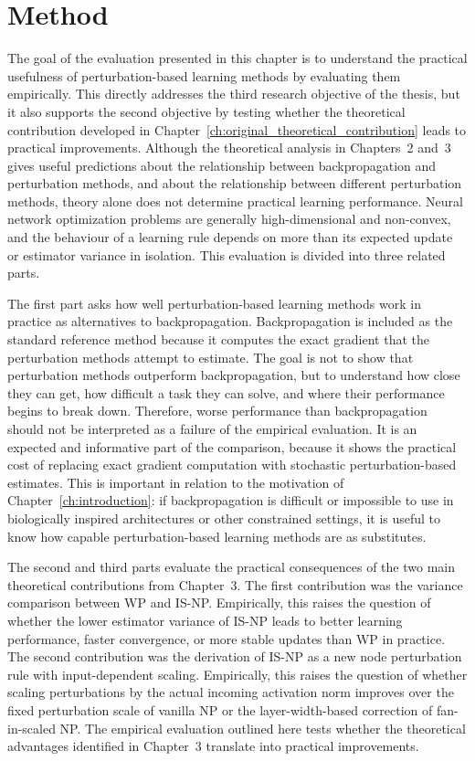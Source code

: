 \section{Method}
\label{ch:method}
\label{sec:empirical_evaluation_strategy}
The goal of the evaluation presented in this chapter is to understand the practical usefulness of perturbation-based learning methods by evaluating them empirically. This directly addresses the third research objective of the thesis, but it also supports the second objective by testing whether the theoretical contribution developed in Chapter~\ref{ch:original_theoretical_contribution} leads to practical improvements. Although the theoretical analysis in Chapters~2 and~3 gives useful predictions about the relationship between backpropagation and perturbation methods, and about the relationship between different perturbation methods, theory alone does not determine practical learning performance. Neural network optimization problems are generally high-dimensional and non-convex, and the behaviour of a learning rule depends on more than its expected update or estimator variance in isolation. This evaluation is divided into three related parts.

The first part asks how well perturbation-based learning methods work in practice as alternatives to backpropagation. Backpropagation is included as the standard reference method because it computes the exact gradient that the perturbation methods attempt to estimate. The goal is not to show that perturbation methods outperform backpropagation, but to understand how close they can get, how difficult a task they can solve, and where their performance begins to break down. Therefore, worse performance than backpropagation should not be interpreted as a failure of the empirical evaluation. It is an expected and informative part of the comparison, because it shows the practical cost of replacing exact gradient computation with stochastic perturbation-based estimates. This is important in relation to the motivation of Chapter~\ref{ch:introduction}: if backpropagation is difficult or impossible to use in biologically inspired architectures or other constrained settings, it is useful to know how capable perturbation-based learning methods are as substitutes.

The second and third parts evaluate the practical consequences of the two main theoretical contributions from Chapter~3. The first contribution was the variance comparison between WP and IS-NP. Empirically, this raises the question of whether the lower estimator variance of IS-NP leads to better learning performance, faster convergence, or more stable updates than WP in practice. The second contribution was the derivation of IS-NP as a new node perturbation rule with input-dependent scaling. Empirically, this raises the question of whether scaling perturbations by the actual incoming activation norm improves over the fixed perturbation scale of vanilla NP or the layer-width-based correction of fan-in-scaled NP. The empirical evaluation outlined here tests whether the theoretical advantages identified in Chapter~3 translate into practical improvements.

